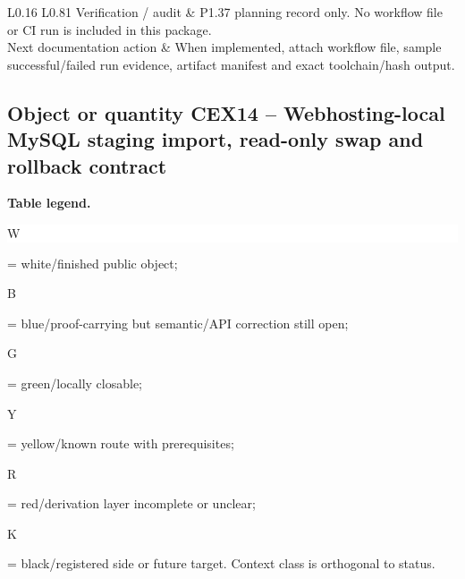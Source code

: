 \begin{longtable}{L{0.16\linewidth} L{0.81\linewidth}}
\hline\addlinespace[0.20em]
Verification /\allowbreak{} audit & P1.37 planning record only. No workflow file or CI run is included in this package.\\
\hline\addlinespace[0.20em]
Next documentation action & When implemented, attach workflow file, sample successful/\allowbreak{}failed run evidence, artifact manifest and exact toolchain/\allowbreak{}hash output.\\
\hline\addlinespace[0.20em]
\end{longtable}
\subsection*{Object or quantity CEX14 -- Webhosting-local MySQL staging import, read-only swap and rollback contract}
\hypertarget{objproof:CEX14}{}
\par\smallskip\noindent\begin{minipage}{0.99\linewidth}\footnotesize\raggedright\textbf{Table legend.} \colorbox{white}{\strut W} = white/finished public object; \colorbox{cyan!20}{\strut B} = blue/proof-carrying but semantic/API correction still open; \colorbox{green!18}{\strut G} = green/locally closable; \colorbox{yellow!25}{\strut Y} = yellow/known route with prerequisites; \colorbox{red!20}{\strut R} = red/derivation layer incomplete or unclear; \colorbox{black!18}{\strut K} = black/registered side or future target. Context class is orthogonal to status.\end{minipage}\par\vspace{0.25em}
